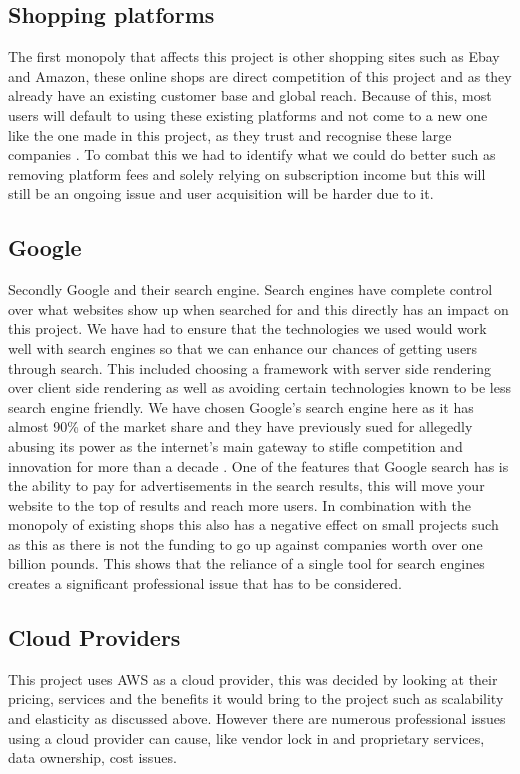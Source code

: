 \documentclass[]{project_report}
\begin{document}
\subsection{Shopping platforms}
The first monopoly that affects this project is other shopping sites such as Ebay and Amazon, these online shops are direct competition of this project and as they already have an existing customer base and global reach. Because of this, most users will default to using these existing platforms and not come to a new one like the one made in this project, as they trust and recognise these large companies . To combat this we had to identify what we could do better such as removing platform fees and solely relying on subscription income but this will still be an ongoing issue and user acquisition will be harder due to it.

\subsection{Google}
Secondly Google and their search engine. Search engines have complete control over what websites show up when searched for and this directly has an impact on this project. We have had to ensure that the technologies we used would work well with search engines so that we can enhance our chances of getting users through search. This included choosing a framework with server side rendering over client side rendering as well as avoiding certain technologies known to be less search engine friendly. We have chosen Google’s search engine here as it has almost 90\% of the market share \cite{search_engine_stat_counter} and they have previously sued for allegedly abusing its power as the internet’s main gateway to stifle competition and innovation for more than a decade \cite{google_lawsuits}. One of the features that Google search has is the ability to pay for advertisements in the search results, this will move your website to the top of results and reach more users. In combination with the monopoly of existing shops this also has a negative effect on small projects such as this as there is not the funding to go up against companies worth over one billion pounds. This shows that the reliance of a single tool for search engines creates a significant professional issue that has to be considered.

\subsection{Cloud Providers}
This project uses AWS as a cloud provider, this was decided by looking at their pricing, services and the benefits it would bring to the project such as scalability and elasticity as discussed above. However there are numerous professional issues using a cloud provider can cause, like vendor lock in and proprietary services, data ownership, cost issues. 
\end{document}
